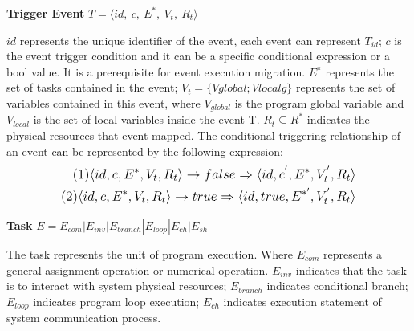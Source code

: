 \begin{definition} \textbf{Trigger Event} $T = \langle id, \ c, \ E^{*}, \ V_t, \ R_t \rangle$
\end{definition}
$id$ represents the unique identifier of the event, each event can represent $T_{id}$;
$c$ is the event trigger condition and it can be a specific conditional expression or a bool value. It is a prerequisite for event execution migration.
$E^{∗}$ represents the set of tasks contained in the event;
$V_t = \{Vglobal; Vlocalg\}$ represents the set of variables contained in this event, where $V_{global}$ is the program global variable and $V_{local}$ is the set of local variables inside the event T.
$R_t \subseteq R^{*}$ indicates the physical resources that event mapped. The conditional triggering relationship of an event can be represented by the following expression:
    \begin{equation*}
        \normalsize
        \begin{aligned}
            (1)\langle id, c, E^{*}, V_t, R_t \rangle \rightarrow false \Rightarrow \langle id, c^{'}, E^{*},V_{t}^{'},R_t \rangle \\
            (2)\langle id, c, E^{*}, V_t, R_t \rangle \rightarrow true \Rightarrow \langle id, true, E^{*'},V_{t}^{'}, R_t \rangle
        \end{aligned}
    \end{equation*}


\begin{definition} \textbf{Task} $E = E_{com} | E_{inv} | E_{branch} | E_{loop} | E_{ch} | E_{sh}$
\end{definition}
The task represents the unit of program execution. Where $E_{com}$ represents a general assignment operation or numerical operation. $E_{inv}$ indicates that the task is to interact with system physical resources; $E_{branch}$ indicates conditional branch; $E_{loop}$ indicates program loop execution; $E_{ch}$ indicates execution statement of system communication process.


